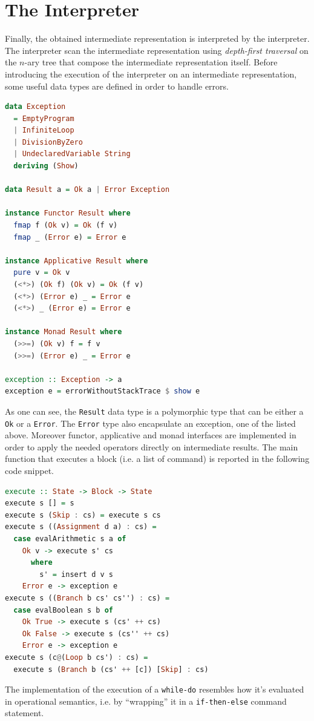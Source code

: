\documentclass[12pt,a4paper]{article}
\begin{document}
\section*{The Interpreter}
Finally, the obtained intermediate representation is interpreted by the interpreter.
The interpreter scan the intermediate representation using \textit{depth-first traversal} on the $n$-ary tree that compose the intermediate representation itself.
Before introducing the execution of the interpreter on an intermediate representation, some useful data types are defined in order to handle errors.
\begin{lstlisting}[language=Haskell, style=custom-style]
data Exception
  = EmptyProgram
  | InfiniteLoop
  | DivisionByZero
  | UndeclaredVariable String
  deriving (Show)

data Result a = Ok a | Error Exception

instance Functor Result where
  fmap f (Ok v) = Ok (f v)
  fmap _ (Error e) = Error e

instance Applicative Result where
  pure v = Ok v
  (<*>) (Ok f) (Ok v) = Ok (f v)
  (<*>) (Error e) _ = Error e
  (<*>) _ (Error e) = Error e

instance Monad Result where
  (>>=) (Ok v) f = f v
  (>>=) (Error e) _ = Error e

exception :: Exception -> a
exception e = errorWithoutStackTrace $ show e
\end{lstlisting}
As one can see, the \texttt{Result} data type is a polymorphic type that can be either a \texttt{Ok} or a \texttt{Error}.
The \texttt{Error} type also encapsulate an exception, one of the listed above.
Moreover functor, applicative and monad interfaces are implemented in order to apply the needed operators directly on intermediate results.
The main function that executes a block (i.e. a list of command) is reported in the following code snippet.
\begin{lstlisting}[language=Haskell, style=custom-style]
execute :: State -> Block -> State
execute s [] = s
execute s (Skip : cs) = execute s cs
execute s ((Assignment d a) : cs) =
  case evalArithmetic s a of
    Ok v -> execute s' cs
      where
        s' = insert d v s
    Error e -> exception e
execute s ((Branch b cs' cs'') : cs) =
  case evalBoolean s b of
    Ok True -> execute s (cs' ++ cs)
    Ok False -> execute s (cs'' ++ cs)
    Error e -> exception e
execute s (c@(Loop b cs') : cs) =
  execute s (Branch b (cs' ++ [c]) [Skip] : cs)
\end{lstlisting}
The implementation of the execution of a \texttt{while-do} resembles how it's evaluated in operational semantics, i.e. by ``wrapping'' it in a \texttt{if-then-else} command statement.
\end{document}
